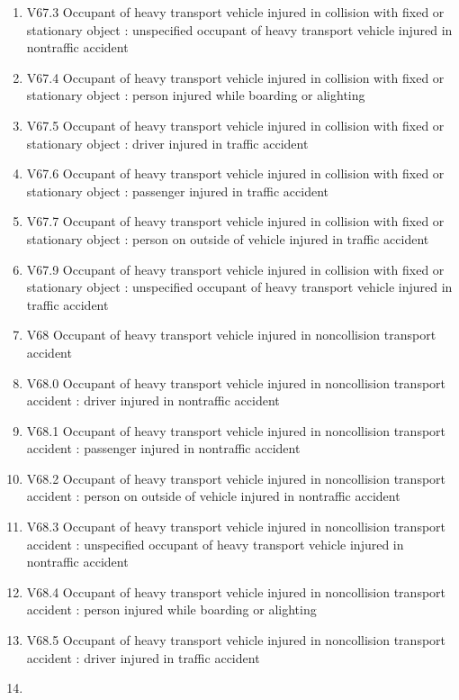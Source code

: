 \documentclass[
]{scrartcl}
\begin{document}
\begin{itemize}
\begin{enumerate}
  \item
    V67.3 Occupant of heavy transport vehicle injured in collision with
    fixed or stationary object : unspecified occupant of heavy transport
    vehicle injured in nontraffic accident
  \item
    V67.4 Occupant of heavy transport vehicle injured in collision with
    fixed or stationary object : person injured while boarding or
    alighting
  \item
    V67.5 Occupant of heavy transport vehicle injured in collision with
    fixed or stationary object : driver injured in traffic accident
  \item
    V67.6 Occupant of heavy transport vehicle injured in collision with
    fixed or stationary object : passenger injured in traffic accident
  \item
    V67.7 Occupant of heavy transport vehicle injured in collision with
    fixed or stationary object : person on outside of vehicle injured in
    traffic accident
  \item
    V67.9 Occupant of heavy transport vehicle injured in collision with
    fixed or stationary object : unspecified occupant of heavy transport
    vehicle injured in traffic accident
  \item
    V68 Occupant of heavy transport vehicle injured in noncollision
    transport accident
  \item
    V68.0 Occupant of heavy transport vehicle injured in noncollision
    transport accident : driver injured in nontraffic accident
  \item
    V68.1 Occupant of heavy transport vehicle injured in noncollision
    transport accident : passenger injured in nontraffic accident
  \item
    V68.2 Occupant of heavy transport vehicle injured in noncollision
    transport accident : person on outside of vehicle injured in
    nontraffic accident
  \item
    V68.3 Occupant of heavy transport vehicle injured in noncollision
    transport accident : unspecified occupant of heavy transport vehicle
    injured in nontraffic accident
  \item
    V68.4 Occupant of heavy transport vehicle injured in noncollision
    transport accident : person injured while boarding or alighting
  \item
    V68.5 Occupant of heavy transport vehicle injured in noncollision
    transport accident : driver injured in traffic accident
  \item

\end{enumerate}
\end{itemize}
\end{document}
